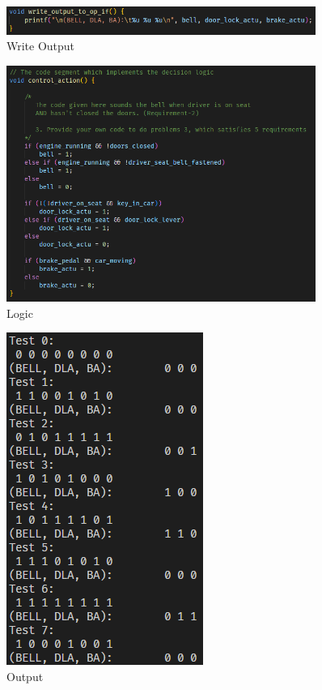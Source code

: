 \begin{enumerate}[a)]
    \begin{figure}[!ht]
        \centering
        \includegraphics[width=0.9\textwidth]{Images/3a Code Write.png}
        \caption{Write Output}
    \end{figure}
    
    \begin{figure}[!ht]
        \centering
        \includegraphics[width=0.9\textwidth]{Images/3a Code Logic.png}
        \caption{Logic}
    \end{figure}

    \begin{figure}[!htt]
        \centering
        \includegraphics{Images/3d Output.png}
        \caption{Output}
    \end{figure}
\end{enumerate}